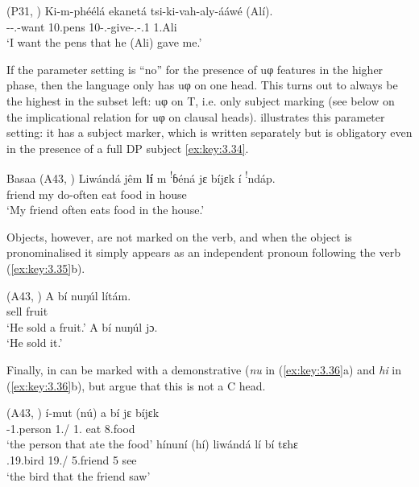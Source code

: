 \documentclass[output=paper]{langsci/langscibook}
\begin{document}
\ea {} (P31, \citealt[210]{vanderWal2010})
    \sn
    \gll Ki-m-phéélá  ekanetá  tsi-ki-vah-aly-ááwé  (Alí).\\
        \Fsg-\Sm-\Prs.\Cj-want  10.pens  10-\Fsg.\Om{}-give-\Pfv.\Rel{}-\Poss{}.1  1.Ali\\
    \glt    ‘I want the pens that he (Ali) gave me.’
\z

If the parameter setting is \enquote{no} for the presence of uφ features in the higher
phase, then the language only has uφ on one head. This turns out to always be
the highest in the subset left: uφ on T, i.e. only subject marking (see
 below on the implicational relation for uφ on clausal heads).
 illustrates this parameter setting: it has a subject marker, which is
written separately but is obligatory even in the presence of a full DP subject
\eqref{ex:key:3.34}.

\ea\label{ex:key:3.34}Basaa (A43, \citealt[277]{Hyman2003}) \label{bkm:Ref347562219}
    \sn
    \gll    Liwándá  jêm  \textbf{lí}  m  \textsuperscript{!}ɓéná  jɛ  bíjɛk  í  \textsuperscript{!}ndáp.\\
        friend  my  \Sm{}  \Prs{}  do-often  eat  food  in  house\\
    \glt    ‘My friend often eats food in the house.’
\z

Objects, however, are not marked on the verb, and when the object is
pronominalised it simply appears as an independent pronoun following the verb
(\ref{ex:key:3.35}b).

\ea\label{ex:key:3.35}  (A43, \citealt[278]{Hyman2003})\label{bkm:Ref347562250}
    \ea
    \gll A  bí  nuŋúl  lítám.\\
        \Sm{}  \Ppp{}  sell  fruit  \\
    \glt    ‘He sold a fruit.’
    \ex A  bí  nuŋúl  jɔ.\\
        ‘He sold it.’
    \z
\z

Finally,  in  can be marked with a demonstrative
(\emph{nu} in (\ref{ex:key:3.36}a) and \emph{hi} in (\ref{ex:key:3.36}b), but
\citet{JenksEtAl2017} argue that this is not a C head.\newpage

\ea\label{ex:key:3.36}  (A43, \citealt[19, 20]{JenksEtAl2017}) \label{bkm:Ref347562274}
    \ea
    \gll    í-mut  (nú)  a  bí  \ds{}jɛ  bíjɛk\\
            \Aug{}{}-1.person  1.\Rel/\Dem{}  1.\Sm{}  \Ppp{}  eat  8.food\\
    \glt        ‘the person that ate the food’
    \ex\label{bkm:Ref347929302}
    \gll    hínuní  (hí)  liwándá  lí  bí  \ds{}tɛhɛ\\
            \Aug{}.19.bird  19.\Rel/\Dem{}  5.friend  5\Sm{}  \Ppp{}  see\\
    \glt        ‘the bird that the friend saw’
    \z
\z
\end{document}
